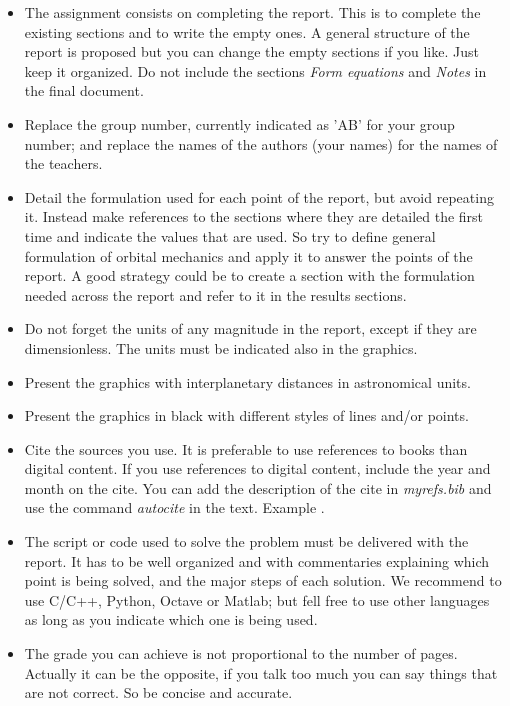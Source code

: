 \begin{itemize}
\item The assignment consists on completing the report. This is to complete the existing sections and to write the empty ones. A general structure of the report is proposed but you can change the empty sections if you like. Just keep it organized. Do not include the sections \textit{Form equations} and \textit{Notes} in the final document.

\item Replace the group number, currently indicated as 'AB' for your group number; and replace the names of the authors (your names) for the names of the teachers.

\item Detail the formulation used for each point of the report, but avoid repeating it. Instead make references to the sections where they are detailed the first time and indicate the values that are used. So try to define general formulation of orbital mechanics and apply it to answer the points of the report. A good strategy could be to create a section with the formulation needed across the report and refer to it in the results sections.

\item Do not forget the units of any magnitude in the report, except if they are dimensionless. The units must be indicated also in the graphics.

\item Present the graphics with interplanetary distances in astronomical units.

\item Present the graphics in black with different styles of lines and/or points.

\item Cite the sources you use. It is preferable to use references to books than digital content. If you use references to digital content, include the year and month on the cite. You can add the description of the cite in \textit{myrefs.bib} and use the command \textit{autocite} in the text. Example \autocite{franchini2008introduccion}.

\item The script or code used to solve the problem must be delivered with the report. It has to be well organized and with commentaries explaining which point is being solved, and the major steps of each solution. We recommend to use C/C++, Python, Octave or Matlab; but fell free to use other languages as long as you indicate which one is being used.

\item The grade you can achieve is not proportional to the number of pages. Actually it can be the opposite, if you talk too much you can say things that are not correct. So be concise and accurate.
\end{itemize}

